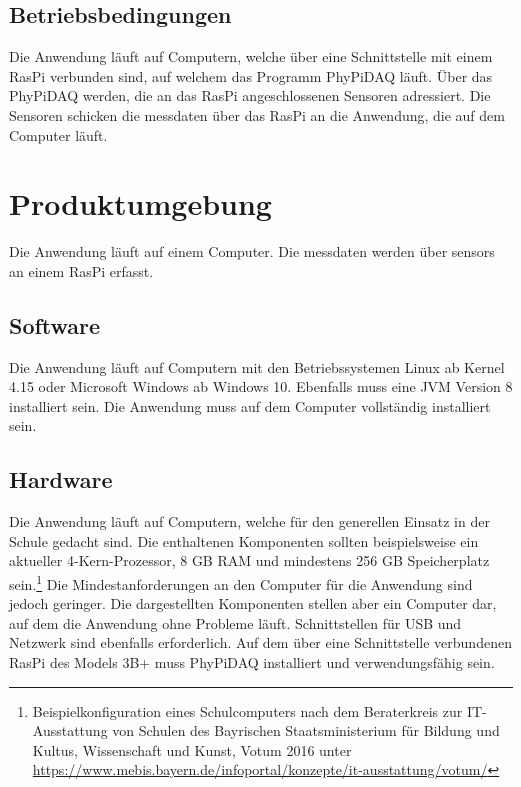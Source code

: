\documentclass[parskip=full]{scrartcl}
\begin{document}
\subsection{Betriebsbedingungen}

Die Anwendung läuft auf Computern, welche über eine Schnittstelle mit einem \gls{RasPi} verbunden sind, auf welchem das Programm \gls{PhyPiDAQ} läuft. Über das \gls{PhyPiDAQ} werden, die an das \gls{RasPi} angeschlossenen Sensoren adressiert. Die Sensoren schicken die \gls{messdaten} über das \gls{RasPi} an die Anwendung, die auf dem Computer läuft. 


\clearpage
\section{Produktumgebung}\label{produktumgebung}

Die Anwendung läuft auf einem Computer. Die \gls{messdaten} werden über \glspl{sensor} an einem \gls{RasPi} erfasst.

\subsection{Software}

Die Anwendung läuft auf Computern mit den Betriebssystemen Linux ab Kernel 4.15 oder Microsoft Windows ab Windows 10.
Ebenfalls muss eine \gls{JVM} Version 8 installiert sein. Die Anwendung muss auf dem Computer vollständig installiert sein. 

\subsection{Hardware}

Die Anwendung läuft auf Computern, welche für den generellen Einsatz in der Schule gedacht sind.
Die enthaltenen Komponenten sollten beispielsweise ein aktueller 4-Kern-Prozessor, 8 GB RAM und
mindestens 256 GB Speicherplatz sein.\footnote{Beispielkonfiguration eines Schulcomputers nach dem Beraterkreis zur IT-Ausstattung von Schulen des Bayrischen Staatsministerium für Bildung und Kultus, Wissenschaft und Kunst, Votum 2016 unter \url{https://www.mebis.bayern.de/infoportal/konzepte/it-ausstattung/votum/}} Die Mindestanforderungen an den Computer für die Anwendung sind jedoch geringer. Die dargestellten Komponenten stellen aber ein Computer dar, auf dem die Anwendung ohne Probleme läuft. Schnittstellen für USB und Netzwerk sind ebenfalls erforderlich. 
Auf dem über eine Schnittstelle verbundenen \gls{RasPi} des Models 3B+ muss \gls{PhyPiDAQ} installiert und verwendungsfähig sein.
\end{document}
